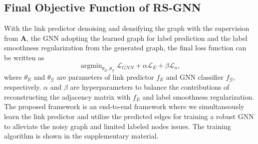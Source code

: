 \subsection{Final Objective Function of RS-GNN} \label{sec:4_4}
With the link predictor denoising and densifying the graph with the supervision from $\mathbf{A}$, the GNN adopting the learned graph for label prediction and the label smoothness regularization from the generated graph, the final loss function can be written as
\begin{equation}
    \mathop{\arg \min}_{\theta_E,\theta_{\mathcal{G}}} \mathcal{L}_{GNN} + \alpha \mathcal{L}_E + \beta \mathcal{L}_u,
    \label{eq:final}
\end{equation}
where $\theta_E$ and $\theta_{\mathcal{G}}$ are parameters of link predictor $f_E$ and GNN classifier $f_\mathcal{G}$, respectively. $\alpha$ and $\beta$ are hyperparameters to balance the contributions of reconstructing the adjacency matrix with $f_E$ and label smoothness regularization. The proposed framework is an end-to-end framework where we simultaneously learn the link predictor and utilize the predicted edges for training a robust GNN to alleviate the noisy graph and limited labeled nodes issues. The training algorithm is shown in the supplementary material.





